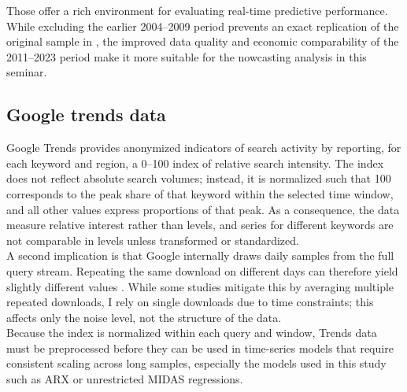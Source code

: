 \documentclass[12pt,a4paper]{article}
\begin{document}
Those offer a rich environment for evaluating real-time predictive performance.
\\
While excluding the earlier 2004–2009 period prevents an exact replication of the original sample in \citet{Askitas}, the improved data quality and economic comparability of the 2011–2023 period make it more suitable for the nowcasting analysis in this seminar.




\subsection{Google trends data}
Google Trends provides anonymized indicators of search activity by reporting, for each keyword and region, a 0–100 index of relative search intensity. The index does not reflect absolute search volumes; instead, it is normalized such that 100 corresponds to the peak share of that keyword within the selected time window, and all other values express proportions of that peak. As a consequence, the data measure relative interest rather than levels, and series for different keywords are not comparable in levels unless transformed or standardized.\\
A second implication is that Google internally draws daily samples from the full query stream. Repeating the same download on different days can therefore yield slightly different values \citep{carrier}.
While some studies mitigate this by averaging multiple repeated downloads, I rely on single downloads due to time constraints; this affects only the noise level, not the structure of the data.\\
Because the index is normalized within each query and window, Trends data must be preprocessed before they can be used in time-series models that require consistent scaling across long samples, especially the models used in this study such as ARX or unrestricted MIDAS regressions.
\end{document}
